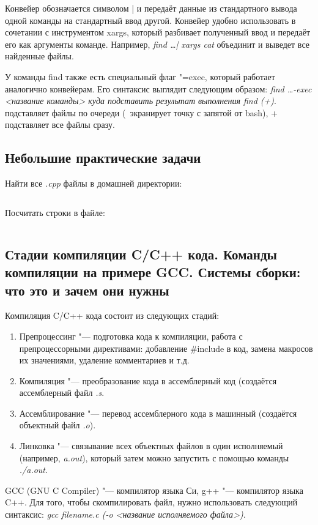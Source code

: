 \documentclass[12pt]{article}
\begin{document}
Конвейер обозначается символом | и передаёт данные из стандартного вывода одной команды на стандартный ввод другой. Конвейер удобно использовать в сочетании с инструментом xargs, который разбивает полученный ввод и передаёт его как аргументы команде. Например, \textit{find \dots | xargs cat} объединит и выведет все найденные файлы.

У команды find также есть специальный флаг "=exec, который работает аналогично конвейерам. Его синтаксис выглядит следующим образом: \textit{find \dots -exec <название команды> {куда подставить результат выполнения find} \; (+)}. \; подставляет файлы по очереди (\ экранирует точку с запятой от bash), + подставляет все файлы сразу.

\subsection{Небольшие практические задачи}
Найти все \textit{.cpp} файлы в домашней директории:
\inputminted{bash}{exam-findcpp.sh}

Посчитать строки в файле:
\inputminted{bash}{exam-countlines.sh}

\subsection{Стадии компиляции C/C++ кода. Команды компиляции на примере GCC. Системы сборки: что это и зачем они нужны}
Компиляция C/C++ кода состоит из следующих стадий:
\begin{enumerate}
\item Препроцессинг "--- подготовка кода к компиляции, работа с препроцессорными директивами: добавление \#include в код, замена макросов их значениями, удаление комментариев и т.д.
\item Компиляция "--- преобразование кода в ассемблерный код (создаётся ассемблерный файл \textit{.s}.
\item Ассемблирование "--- перевод ассемблерного кода в машинный (создаётся объектный файл \textit{.o}).
\item Линковка "--- связывание всех объектных файлов в один исполняемый (например, \textit{a.out}), который затем можно запустить с помощью команды \textit{./a.out}.
\end{enumerate}

GCC (GNU C Compiler) "--- компилятор языка Си, g++ "--- компилятор языка C++. Для того, чтобы скомпилировать файл, нужно использовать следующий синтаксис: \textit{gcc filename.c (-o <название исполняемого файла>)}.
\end{document}
